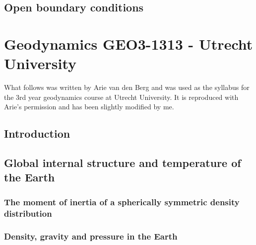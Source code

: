 \documentclass[a4paper]{article}
\begin{document}
\subsection{Open boundary conditions}\label{ss:openbc} %





\newpage
\section{Geodynamics GEO3-1313 - Utrecht University}
What follows was written by Arie van den Berg and was used as the syllabus for the 
3rd year geodynamics course at Utrecht University. It is reproduced with Arie's permission
and has been slightly modified by me.

\subsection{Introduction} %
\subsection{Global internal structure and temperature of the Earth} %
\subsubsection{The moment of inertia of a spherically symmetric density distribution} %
\label{sect_scalarmomint}  %
\subsubsection{Density, gravity and pressure in the Earth} %
\label{section_Density-gravity-pressure}  %
\end{document}
